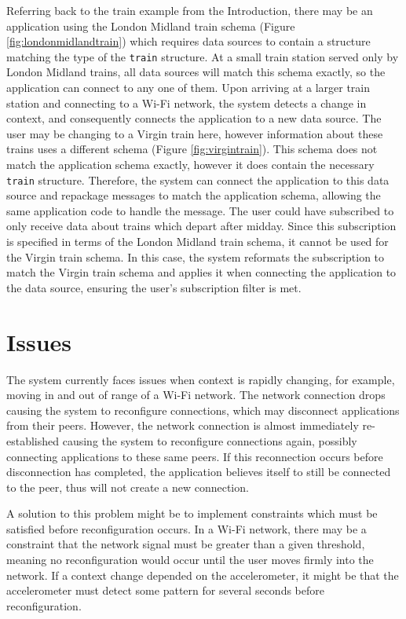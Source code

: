 \documentclass[12pt,twoside,notitlepage]{report}
\begin{document}
Referring back to the train example from the Introduction, there may be an application using the London Midland train schema (Figure \ref{fig:londonmidlandtrain}) which requires data sources to contain a structure matching the type of the {\tt train} structure. 
At a small train station served only by London Midland trains, all data sources will match this schema exactly, so the application can connect to any one of them.
Upon arriving at a larger train station and connecting to a Wi-Fi network, the system detects a change in context, and consequently connects the application to a new data source. 
The user may be changing to a Virgin train here, however information about these trains uses a different schema (Figure \ref{fig:virgintrain}). 
This schema does not match the application schema exactly, however it does contain the necessary {\tt train} structure. 
Therefore, the system can connect the application to this data source and repackage messages to match the application schema, allowing the same application code to handle the message. 
The user could have subscribed to only receive data about trains which depart after midday. 
Since this subscription is specified in terms of the London Midland train schema, it cannot be used for the Virgin train schema. 
In this case, the system reformats the subscription to match the Virgin train schema and applies it when connecting the application to the data source, ensuring the user's subscription filter is met.

\section{Issues}
The system currently faces issues when context is rapidly changing, for example, moving in and out of range of a Wi-Fi network. 
The network connection drops causing the system to reconfigure connections, which may disconnect applications from their peers.
However, the network connection is almost immediately re-established causing the system to reconfigure connections again, possibly connecting applications to these same peers. 
If this reconnection occurs before disconnection has completed, the application believes itself to still be connected to the peer, thus will not create a new connection.

A solution to this problem might be to implement constraints which must be satisfied before reconfiguration occurs. 
In a Wi-Fi network, there may be a constraint that the network signal must be greater than a given threshold, meaning no reconfiguration would occur until the user moves firmly into the network. 
If a context change depended on the accelerometer, it might be that the accelerometer must detect some pattern for several seconds before reconfiguration.
\end{document}
